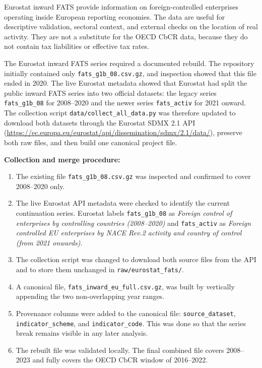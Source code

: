 \documentclass[11pt,a4paper]{article}
\begin{document}
Eurostat inward FATS provide information on foreign-controlled enterprises
operating inside European reporting economies.  The data are useful for
descriptive validation, sectoral context, and external checks on the location of
real activity.  They are not a substitute for the OECD CbCR data, because they
do not contain tax liabilities or effective tax rates.

The Eurostat inward FATS series required a documented rebuild.  The repository
initially contained only \texttt{fats\_g1b\_08.csv.gz}, and inspection showed
that this file ended in 2020.  The live Eurostat metadata showed that Eurostat
had split the public inward FATS series into two official datasets: the legacy
series \texttt{fats\_g1b\_08} for 2008--2020 and the newer series
\texttt{fats\_activ} for 2021 onward.  The collection script
\texttt{data/collect\_all\_data.py} was therefore updated to download both
datasets through the Eurostat SDMX 2.1 API
(\url{https://ec.europa.eu/eurostat/api/dissemination/sdmx/2.1/data/}),
preserve both raw files, and then build one canonical project file.

\noindent\textbf{Collection and merge procedure:}
\begin{enumerate}[noitemsep]
    \item The existing file \texttt{fats\_g1b\_08.csv.gz} was inspected and
    confirmed to cover 2008--2020 only.
    \item The live Eurostat API metadata were checked to identify the current
    continuation series.  Eurostat labels \texttt{fats\_g1b\_08} as
    \emph{Foreign control of enterprises by controlling countries (2008--2020)}
    and \texttt{fats\_activ} as \emph{Foreign controlled EU enterprises by NACE
    Rev.2 activity and country of control (from 2021 onwards)}.
    \item The collection script was changed to download both source files from
    the API and to store them unchanged in \texttt{raw/eurostat\_fats/}.
    \item A canonical file, \texttt{fats\_inward\_eu\_full.csv.gz}, was built by
    vertically appending the two non-overlapping year ranges.
    \item Provenance columns were added to the canonical file:
    \texttt{source\_dataset}, \texttt{indicator\_scheme}, and
    \texttt{indicator\_code}.  This was done so that the series break remains
    visible in any later analysis.
    \item The rebuilt file was validated locally.  The final combined file
    covers 2008--2023 and fully covers the OECD CbCR window of 2016--2022.
\end{enumerate}
\end{document}
